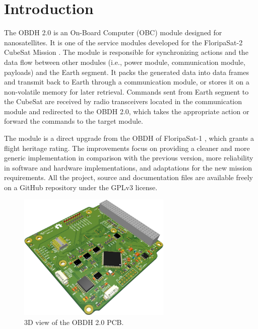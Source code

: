 %
%
%
%
%

%
%
%
%
%
%

\chapter{Introduction} \label{ch:introduction}

The OBDH 2.0 is an On-Board Computer (OBC) module designed for nanosatellites. It is one of the service modules developed for the FloripaSat-2 CubeSat Mission \cite{floripasat2}. The module is responsible for synchronizing actions and the data flow between other modules (i.e., power module, communication module, payloads) and the Earth segment. It packs the generated data into data frames and transmit back to Earth through a communication module, or stores it on a non-volatile memory for later retrieval. Commands sent from Earth segment to the CubeSat are received by radio transceivers located in the communication module and redirected to the OBDH 2.0, which takes the appropriate action or forward the commands to the target module.

The module is a direct upgrade from the OBDH of FloripaSat-1 \cite{obdh-fsat}, which grants a flight heritage rating. The improvements focus on providing a cleaner and more generic implementation in comparison with the previous version, more reliability in software and hardware implementations, and adaptations for the new mission requirements. All the project, source and documentation files are available freely on a GitHub repository \cite{obdh2-repo} under the GPLv3 license.


\begin{figure}[!ht]
    \begin{center}
        \includegraphics[width=0.65\textwidth]{figures/obdh2-pcb-3d.png}
        \caption{3D view of the OBDH 2.0 PCB.}
        \label{fig:pcb-3d}
    \end{center}
\end{figure}
